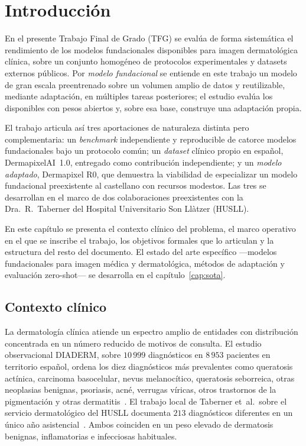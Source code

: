 
\chapter{Introducción}
\label{cap:intro}

En el presente Trabajo Final de Grado (TFG) se evalúa de forma
sistemática el rendimiento de los modelos fundacionales disponibles
para imagen dermatológica clínica, sobre un conjunto homogéneo de
protocolos experimentales y datasets externos públicos. Por
\emph{modelo fundacional} se entiende en este trabajo un modelo de
gran escala preentrenado sobre un volumen amplio de datos y
reutilizable, mediante adaptación, en múltiples tareas posteriores;
el estudio evalúa los disponibles con pesos abiertos y, sobre esa
base, construye una adaptación propia.

El trabajo articula así tres aportaciones de naturaleza distinta pero
complementaria: un \emph{benchmark} independiente y reproducible de
catorce modelos fundacionales bajo un protocolo común; un
\emph{dataset} clínico propio en español, DermapixelAI~1.0, entregado
como contribución independiente; y un \emph{modelo adaptado},
Dermapixel R0, que demuestra la viabilidad de especializar un modelo
fundacional preexistente al castellano con recursos modestos. Las tres
se desarrollan en el marco de dos colaboraciones preexistentes con la
Dra.~R.~Taberner del Hospital Universitario Son Llàtzer (HUSLL).

En este capítulo se presenta el contexto clínico del problema, el
marco operativo en el que se inscribe el trabajo, los objetivos
formales que lo articulan y la estructura del resto del documento. El estado del arte específico ---modelos fundacionales
para imagen médica y dermatológica, métodos de adaptación y
evaluación zero-shot--- se desarrolla en el
capítulo~\ref{cap:sota}.


\section{Contexto clínico}
\label{sec:contexto}

La dermatología clínica atiende un espectro amplio de entidades con
distribución concentrada en un número reducido de motivos de
consulta. El estudio observacional DIADERM, sobre $10\,999$
diagnósticos en $8\,953$ pacientes en territorio español,
ordena los diez diagnósticos más prevalentes como queratosis
actínica, carcinoma basocelular, nevus melanocítico, queratosis
seborreica, otras neoplasias benignas, psoriasis, acné, verrugas
víricas, otros trastornos de la pigmentación y otras
dermatitis~\cite{diaderm2018}. El trabajo local de Taberner et~al.\
sobre el servicio dermatológico del HUSLL documenta $213$
diagnósticos diferentes en un único año
asistencial~\cite{taberner2010_motivos}. Ambos coinciden en un peso
elevado de dermatosis benignas, inflamatorias e infecciosas
habituales.

